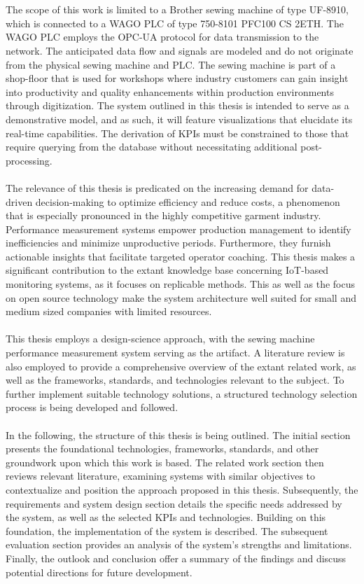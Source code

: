 \\\\
The scope of this work is limited to a Brother sewing machine of type UF-8910, which is connected to a WAGO PLC of type 750-8101 PFC100 CS 2ETH. The WAGO PLC employs the OPC-UA protocol for data transmission to the network. The anticipated data flow and signals are modeled and do not originate from the physical sewing machine and PLC. The sewing machine is part of a shop-floor that is used for workshops where industry customers can gain insight into productivity and quality enhancements within production environments through digitization. The system outlined in this thesis is intended to serve as a demonstrative model, and as such, it will feature visualizations that elucidate its real-time capabilities. The derivation of KPIs must be constrained to those that require querying from the database without necessitating additional post-processing.
\\\\
The relevance of this thesis is predicated on the increasing demand for data-driven decision-making to optimize efficiency and reduce costs, a phenomenon that is especially pronounced in the highly competitive garment industry. Performance measurement systems empower production management to identify inefficiencies and minimize unproductive periods. Furthermore, they furnish actionable insights that facilitate targeted operator coaching. This thesis makes a significant contribution to the extant knowledge base concerning IoT-based monitoring systems, as it focuses on replicable methods. This as well as the focus on open source technology make the system architecture well suited for small and medium sized companies with limited resources.
\\\\
This thesis employs a design-science approach, with the sewing machine performance measurement system serving as the artifact. A literature review is also employed to provide a comprehensive overview of the extant related work, as well as the frameworks, standards, and technologies relevant to the subject. To further implement suitable technology solutions, a structured technology selection process is being developed and followed.
\\\\
In the following, the structure of this thesis is being outlined. The initial section presents the foundational technologies, frameworks, standards, and other groundwork upon which this work is based. The related work section then reviews relevant literature, examining systems with similar objectives to contextualize and position the approach proposed in this thesis. Subsequently, the requirements and system design section details the specific needs addressed by the system, as well as the selected KPIs and technologies. Building on this foundation, the implementation of the system is described. The subsequent evaluation section provides an analysis of the system’s strengths and limitations. Finally, the outlook and conclusion offer a summary of the findings and discuss potential directions for future development.




